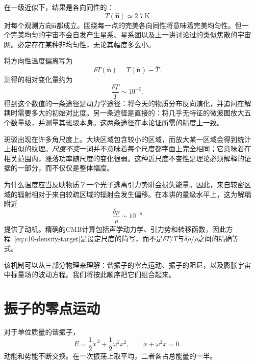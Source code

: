 在一级近似下，结果是各向同性的：
\[
T(\hat{\mathbf n})\simeq 2.7\,\mathrm K
\]
对每个观测方向\(\hat{\mathbf n}\)都成立。围绕每一点的完美各向同性将意味着完美均匀性。但一个完美均匀的宇宙不会自发产生星系、星系团以及上一讲讨论过的类似焦散的宇宙网。必定存在某种非均匀性，无论其幅度多么小。

将方向性温度偏离写为
\[
\delta T(\hat{\mathbf n})=T(\hat{\mathbf n})-\bar T.
\]
测得的相对变化量约为
\begin{equation}
\frac{\delta T}{T}\sim10^{-5}.
\label{eq:c10-cmb-anisotropy}
\end{equation}
得到这个数值的一条途径是动力学途径：将今天的物质分布反向演化，并追问在解耦时需要多大的初始对比度。另一条途径是直接的：将几乎无特征的微波图放大五个数量级，并测量其斑驳本身。这两条途径在本论证所需的精度上一致。

斑驳出现在许多角尺度上。大块区域包含较小的区域，而放大某一区域会得到统计上相似的纹理。\emph{尺度不变}一词并不意味着每个尺度都字面上完全相同；它意味着在相关范围内，涨落功率随尺度的变化很弱。这种近尺度不变性是理论必须解释的证据的一部分，而不仅仅是整体幅度。

为什么温度应当反映物质？一个光子逃离引力势阱会损失能量。因此，来自较密区域的辐射相对于来自较疏区域的辐射会发生偏移。在本讲的量级水平上，这为解耦附近
\begin{equation}
\frac{\delta\rho}{\rho}\sim10^{-5}
\label{eq:c10-density-target}
\end{equation}
提供了动机。精确的CMB计算包括声学动力学、引力势和转移函数，因此方程~\eqref{eq:c10-density-target}是设定尺度的简写，而不是\(\delta T/T\)与\(\delta\rho/\rho\)之间的精确等式。

\begin{classroomqa}
\end{classroomqa}

该机制可以从三部分物理来理解：谐振子的零点运动、振子的阻尼，以及膨胀宇宙中标量场的波动方程。我们将按此顺序把它们组合起来。

\section{振子的零点运动}

对于单位质量的谐振子，
\begin{equation}
E=\frac12\dot x^{\,2}+\frac12\omega^2x^2,
\qquad
\ddot x+\omega^2x=0.
\label{eq:c10-undamped}
\end{equation}
动能和势能不断交换。在一次振荡上取平均，二者各占总能量的一半。

